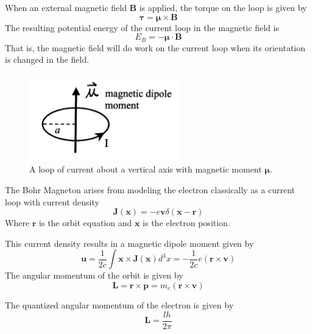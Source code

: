 \documentclass[twocolumn]{article}
\begin{document}
		When an external magnetic field $\mathbf{B}$ is applied, the torque on the loop is given by
		\begin{equation}
			\boldsymbol{\tau} = \boldsymbol{\mu} \times \mathbf{B}
		\end{equation}
		The resulting potential energy of the current loop in the magnetic field is
		\begin{equation}
			E_{B} = -\boldsymbol{\mu}\cdot \mathbf{B}
		\end{equation}
		That is, the magnetic field will do work on the current loop when its orientation is changed in the field.
		
		
		\begin{figure}
			\centering
			\includegraphics[width=0.7\linewidth]{Images/CurrentLoopDiagram}
			\caption{A loop of current about a vertical axis with magnetic moment $\mathbf{\mu}$.}
			\label{fig:CurrentLoopDiagram}
		\end{figure}

		
		The Bohr Magneton arises from modeling the electron classically as a current loop with current density
		\begin{equation}
			\mathbf{J(x)} = -e\mathbf{v} \delta\left(\mathbf{x} - \mathbf{r}\right)
		\end{equation}
		Where $\mathbf{r}$ is the orbit equation and $\mathbf{x}$ is the electron position.
		
		This current density results in a magnetic dipole moment given by
		\begin{equation}
			\mathbf{u} = \frac{1}{2c}\int \mathbf{x} \times \mathbf{J(x)} d^3x = -\frac{1}{2c}e\left(\mathbf{r \times v}\right)
		\end{equation}
		The angular momentum of the orbit is given by
		\begin{equation}
			\mathbf{L} = \mathbf{r \times p} = m_e\left(\mathbf{r \times v}\right)
		\end{equation}
		
		The quantized angular momentum of the electron is given by 
		\begin{equation}
			\mathbf{L} = \frac{lh}{2\pi}
		\end{equation}
		
\end{document}
